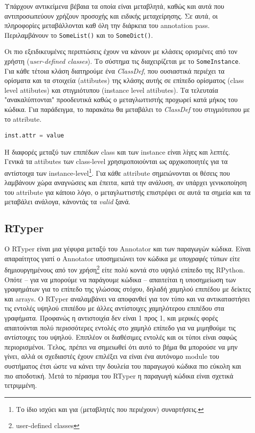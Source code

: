 Υπάρχουν αντικείμενα βέβαια τα οποία είναι μεταβλητά, καθώς και αυτά που
αντιπροσωπεύουν χρήζουν προσοχής και ειδικής μεταχείρησης. Σε αυτά, οι 
πληροφορίες μεταβάλλονται καθ όλη την διάρκεια του annotation pass.
Περιλαμβάνουν το \texttt{SomeList()} και το \texttt{SomeDict()}.

Οι πιο εξειδικευμένες περιπτώσεις έχουν να κάνουν με κλάσεις ορισμένες από τον
χρήστη (\textit{user-defined classes}). Το σύστημα τις διαχειρίζεται με το
\texttt{SomeInstance}. Για κάθε τέτοια κλάση διατηρούμε ένα \textit{ClassDef},
που ουσιαστικά περιέχει τα ορίσματα και τα στοιχεία (attibutes) της κλάσης αυτής
σε επίπεδο ορίσματος (class level attibutes) και στιγμιότυπου (instance level
attibutes). Τα τελευταία "ανακαλύπτονται" προοδευτικά καθώς ο μεταγλωττιστής
προχωρεί κατά μήκος του κώδικα. Για παράδειγμα, το παρακάτω θα μεταβάλει το
\textit{ClassDef} του στιγμιότυπου με το attribute.
\begin{lstlisting}[language=Python]
inst.attr = value
\end{lstlisting}

Η διαφορές μεταξύ των επιπέδων class και των instance είναι λίγες και λεπτές.
Γενικά τα attibutes των class-level χρησιμοποιούνται ως αρχικοποιητές για τα
αντίστοιχα των instance-level\footnote{Το ίδιο ισχύει και για (μεταβλητές που
περιέχουν) συναρτήσεις.}. Για κάθε attribute σημειώνονται οι θέσεις που
λαμβάνουν χώρα αναγνώσεις και έπειτα, κατά την ανάλυση, αν υπάρχει γενικοποίηση
του attribute για κάποιο λόγο, ο μεταγλωττιστής επιστρέφει σε αυτά τα σημεία και
τα μεταβάλει ανάλογα, κάνοντάς τα \textit{valid} ξανά.

\subsection{RTyper}

Ο RTyper είναι μια γέφυρα μεταξύ του Annotator και των παραγωγών κώδικα. Είναι
απαραίτητος γιατί ο Annotator υποσημειώνει τον κώδικα με \textit{υπογραφές}
τύπων είτε δημιουργημένους από τον χρήση\footnote{user-defined classes} είτε
πολύ κοντά στο υψηλό επίπεδο της RPython. Οπότε – για να μπορούμε να παράγουμε
κώδικα – απαιτείται η υποσημείωση των γραφημάτων για το επίπεδο της γλώσσας
στόχου, δηλαδή χαμηλού επιπέδου με δείκτες και arrays. Ο RTyper αναλαμβάνει να
αποφανθεί για τον τύπο και να αντικαταστήσει τις εντολές υψηλού επιπέδου με
άλλες αντίστοιχες χαμηλότερου επιπέδου στα γραφήματα. Προφανώς η αντιστοιχία
δεν είναι 1 προς 1, και μερικές φορές απαιτούνται πολύ περισσότερες εντολές στο
χαμηλό επίπεδο για να μιμηθούμε τις αντίστοιχες του υψηλού. Επιπλέον οι
διαθέσιμες εντολές και οι τύποι είναι σαφώς περιορισμένοι. Τελος, πρέπει να
σημειωθεί ότι αυτό το βήμα θα μπορούσε να μην γίνει, αλλά οι σχεδιαστές έχουν
επιλέξει να είναι ένα αυτόνομο module του συστήματος έτσι ώστε να κάνει την
δουλεία του παραγωγού κώδικα πιο εύκολη και πιο αποδοτική. Μετά το πέρασμα του
RTyper η παραγωγή κώδικα είναι σχετικά τετριμμένη.

